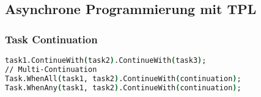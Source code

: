 \subsection{Asynchrone Programmierung mit TPL}
\subsubsection{Task Continuation}
\begin{lstlisting}[language=csh]
task1.ContinueWith(task2).ContinueWith(task3);
// Multi-Continuation
Task.WhenAll(task1, task2).ContinueWith(continuation);
Task.WhenAny(task1, task2).ContinueWith(continuation);
\end{lstlisting}

